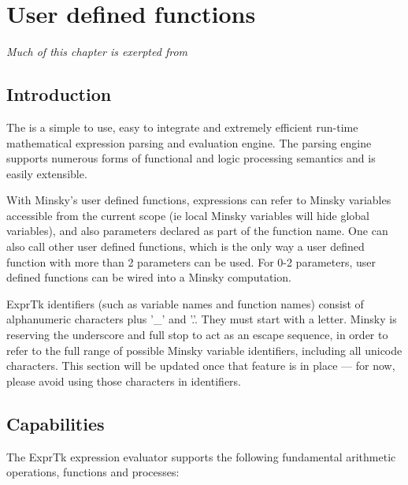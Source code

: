 \chapter{User defined functions}\label{ExprTk}

{\em Much of this chapter is exerpted from }

\section{Introduction}
The  is  a simple
to  use,   easy  to   integrate  and   extremely  efficient   run-time
mathematical  expression parsing  and evaluation  engine. The  parsing
engine  supports numerous  forms  of  functional and  logic processing
semantics and is easily extensible.

With Minsky's user defined functions, expressions can refer to Minsky
variables accessible from the current scope (ie local Minsky variables
will hide global variables), and also parameters declared as part of
the function name. One can also call other user defined functions,
which is the only way a user defined function with more than 2
parameters can be used. For 0-2 parameters, user defined functions can
be wired into a Minsky computation.

ExprTk identifiers (such as variable names and function names) consist
of alphanumeric characters plus '\_' and '.'. They must start with a
letter. Minsky is reserving the underscore and full stop to act as an
escape sequence, in order to refer to the full range of possible
Minsky variable identifiers, including all unicode characters. This
section will be updated once that feature is in place --- for now,
please avoid using those characters in identifiers.

\section{Capabilities}
The  ExprTk expression  evaluator supports  the following  fundamental
arithmetic operations, functions and processes:

